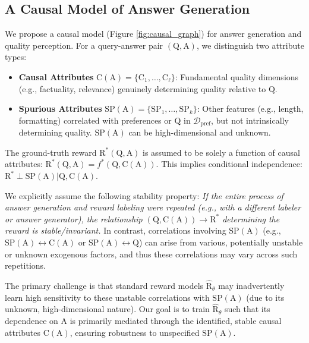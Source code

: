 \vspace{-0.05in}
\subsection{A Causal Model of Answer Generation}
\label{subsec:causal_graph}

\vspace{-0.05in}
We propose a causal model (Figure \ref{fig:causal_graph}) for answer generation and quality perception. For a query-answer pair $(\mathrm{Q}, \mathrm{A})$, we distinguish two attribute types:

\vspace{-0.1in}
\begin{itemize}[itemsep=0pt,left=0pt]
    \item \textbf{Causal Attributes} $\mathrm{C}(\mathrm{A}) = \{\mathrm{C}_1, \dots, \mathrm{C}_\ell\}$: Fundamental quality dimensions (e.g., factuality, relevance) genuinely determining quality relative to $\mathrm{Q}$.
    \item \textbf{Spurious Attributes} $\mathrm{SP}(\mathrm{A}) = \{\mathrm{SP}_1, \dots, \mathrm{SP}_k\}$: Other features (e.g., length, formatting) correlated with preferences or $\mathrm{Q}$ in $\mathcal{D}_{\mathrm{pref}}$, but not intrinsically determining quality. $\mathrm{SP}(\mathrm{A})$ can be high-dimensional and unknown.
\end{itemize}

\vspace{-0.1in}
The ground-truth reward $\mathrm{R}^*(\mathrm{Q}, \mathrm{A})$ is assumed to be solely a function of causal attributes: $\mathrm{R}^*(\mathrm{Q}, \mathrm{A}) = f^*(\mathrm{Q}, \mathrm{C}(\mathrm{A}))$. This implies conditional independence: $\mathrm{R}^* \perp \mathrm{SP}(\mathrm{A}) | \mathrm{Q}, \mathrm{C}(\mathrm{A})$.

We explicitly assume the following stability property: \textit{If the entire process of answer generation and reward labeling were repeated (e.g., with a different labeler or answer generator), the relationship $(\mathrm{Q}, \mathrm{C}(\mathrm{A})) \to \mathrm{R}^{*}$ determining the reward is stable/invariant.} In contrast, correlations involving $\mathrm{SP}(\mathrm{A})$ (e.g., $\mathrm{SP}(\mathrm{A}) \leftrightarrow \mathrm{C}(\mathrm{A})$ or $\mathrm{SP}(\mathrm{A}) \leftrightarrow \mathrm{Q}$) can arise from various, potentially unstable or unknown exogenous factors, and thus these correlations may vary across such repetitions.

The primary challenge is that standard reward models $\hat{\mathrm{R}}_\theta$ may inadvertently learn high sensitivity to these unstable correlations with $\mathrm{SP}(\mathrm{A})$ (due to its unknown, high-dimensional nature). Our goal is to train $\hat{\mathrm{R}}_\theta$ such that its dependence on $\mathrm{A}$ is primarily mediated through the identified, stable causal attributes $\mathrm{C}(\mathrm{A})$, ensuring robustness to unspecified $\mathrm{SP}(\mathrm{A})$.

